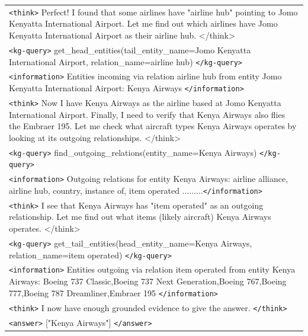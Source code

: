 \begin{table}[ht]
\begin{tabular}{>{\raggedright\arraybackslash}p{}}
\rowcolor{blue!10}
\texttt{<think>} Perfect! I found that some airlines have "airline hub" pointing to Jomo Kenyatta International Airport. Let me find out which airlines have Jomo Kenyatta International Airport as their airline hub. {</think>} \\

\rowcolor{green!10}
\texttt{<kg-query>} get\_head\_entities(tail\_entity\_name=Jomo Kenyatta International Airport, relation\_name=airline hub)  \texttt{</kg-query>} \\
\rowcolor{yellow!10}
\texttt{<information>} Entities incoming via relation airline hub from entity Jomo Kenyatta International Airport: Kenya Airways \texttt{</information>} \\

\rowcolor{blue!10}
\texttt{<think>} Now I have Kenya Airways as the airline based at Jomo Kenyatta International Airport. Finally, I need to verify that Kenya Airways also flies the Embraer 195. Let me check what aircraft types Kenya Airways operates by looking at its outgoing relationships. {</think>} \\

\rowcolor{green!10}
\texttt{<kg-query>} find\_outgoing\_relations(entity\_name=Kenya Airways)  \texttt{</kg-query>} \\
\rowcolor{yellow!10}
\texttt{<information>} Outgoing relations for entity Kenya Airways: airline alliance, airline hub, country, instance of, item operated .........\texttt{</information>} \\

\rowcolor{blue!10}
\texttt{<think>} I see that Kenya Airways has "item operated" as an outgoing relationship. Let me find out what items (likely aircraft) Kenya Airways operates. {</think>} \\

\rowcolor{green!10}
\texttt{<kg-query>} get\_tail\_entities(head\_entity\_name=Kenya Airways, relation\_name=item operated)  \texttt{</kg-query>} \\
\rowcolor{yellow!10}
\texttt{<information>} Entities outgoing via relation item operated from entity Kenya Airways: Boeing 737 Classic,Boeing 737 Next Generation,Boeing 767,Boeing 777,Boeing 787 Dreamliner,Embraer 195 \texttt{</information>} \\

\rowcolor{blue!10}
\texttt{<think>}  I now have enough grounded evidence to give the answer. \texttt{</think>} \\

\rowcolor{green!30}
\texttt{<answer>} ["Kenya Airways"] \texttt{</answer>} \\
\end{tabular}

\label{tab:fogcase}
\end{table}